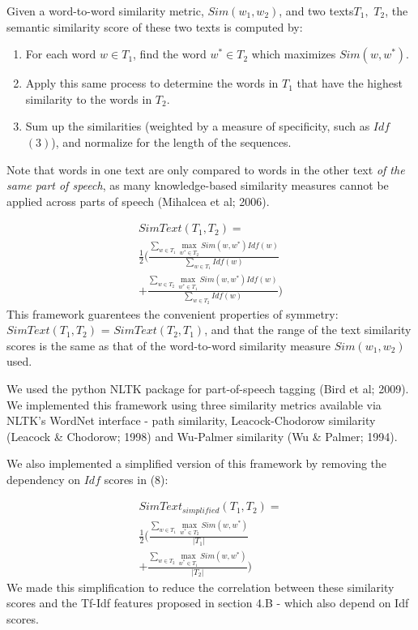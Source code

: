 \documentclass[letterpaper, 10 pt, conference]{ieeeconf}  %
\DeclareMathOperator*{\maxU}{max}
\begin{document}
Given a word-to-word similarity metric, $Sim(w_1, w_2)$, and two texts\footnotemark[3] $T_1,$ $T_2$, the semantic similarity score of these two texts is computed by:
\begin{enumerate}
\item For each word $w \in T_1$, find the word $w^* \in T_2$ which maximizes $Sim(w, w^*)$.
\item Apply this same process to determine the words in $T_1$ that have the highest similarity to the words in $T_2$. 
\item Sum up the similarities (weighted by a measure of specificity, such as $Idf$ $(3)$), and normalize for the length of the sequences. 
\end{enumerate}
Note that words in one text are only compared to words in the other text \emph{of the same part of speech}, as many knowledge-based similarity measures cannot be applied across parts of speech (Mihalcea et al; 2006).

\begin{gather*} \tag{8}
SimText(T_1,T_2) = \\ \frac{1}{2}\Big( \frac{\sum_{w \in T_1}{\maxU_{w^* \in T_2}Sim(w,w^*)Idf(w)}}{\sum_{w \in T_1}Idf(w)} \\ + \frac{\sum_{w \in T_2}{\maxU_{w^* \in T_1}Sim(w,w^*)Idf(w)}}{\sum_{w \in T_2}Idf(w)} \Big)
\end{gather*}
This framework guarentees the convenient properties of symmetry: $SimText(T_1, T_2)$ = $SimText(T_2, T_1)$, and that the range of the text similarity scores is the same as that of the word-to-word similarity measure  $Sim(w_1, w_2)$ used. 

We used the python NLTK package for part-of-speech tagging (Bird et al; 2009). We implemented this framework using three similarity metrics available via NLTK’s WordNet interface - path similarity, Leacock-Chodorow similarity (Leacock \& Chodorow; 1998) and Wu-Palmer similarity (Wu \& Palmer; 1994). 

We also implemented a simplified version of this framework by removing the dependency on $Idf$ scores in (8):

\begin{gather*} \tag{9}
SimText_{simplified}(T_1,T_2) = \\ \frac{1}{2}\Big( \frac{\sum_{w \in T_1}{\maxU_{w^* \in T_2}Sim(w,w^*)}}{|T_1|} \\ + \frac{\sum_{w \in T_2}{\maxU_{w^* \in T_1}Sim(w,w^*)}}{|T_2|} \Big)
\end{gather*}
We made this simplification to reduce the correlation between these similarity scores and the Tf-Idf features proposed in section 4.B - which also depend on Idf scores.
\end{document}
